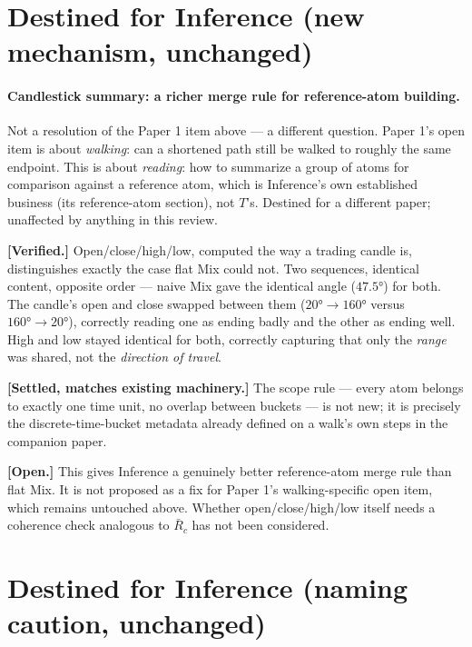 \documentclass[11pt]{article}
\begin{document}
\section{Destined for Inference (new mechanism, unchanged)}

\paragraph{Candlestick summary: a richer merge rule for reference-atom
building.} Not a resolution of the Paper 1 item above --- a different
question. Paper 1's open item is about \emph{walking}: can a shortened
path still be walked to roughly the same endpoint. This is about
\emph{reading}: how to summarize a group of atoms for comparison
against a reference atom, which is Inference's own established
business (its reference-atom section), not $T$'s. Destined for a
different paper; unaffected by anything in this review.

\textbf{[Verified.]} Open/close/high/low, computed the way a trading
candle is, distinguishes exactly the case flat Mix could not. Two
sequences, identical content, opposite order --- naive Mix gave the
identical angle ($47.5°$) for both. The candle's open and close swapped
between them ($20°\!\to\!160°$ versus $160°\!\to\!20°$), correctly
reading one as ending badly and the other as ending well. High and low
stayed identical for both, correctly capturing that only the
\emph{range} was shared, not the \emph{direction of travel}.

\textbf{[Settled, matches existing machinery.]} The scope rule ---
every atom belongs to exactly one time unit, no overlap between
buckets --- is not new; it is precisely the discrete-time-bucket
metadata already defined on a walk's own steps in the companion paper.

\textbf{[Open.]} This gives Inference a genuinely better reference-atom
merge rule than flat Mix. It is not proposed as a fix for Paper 1's
walking-specific open item, which remains untouched above. Whether
open/close/high/low itself needs a coherence check analogous to
$\bar R_c$ has not been considered.

\section{Destined for Inference (naming caution, unchanged)}
\end{document}
